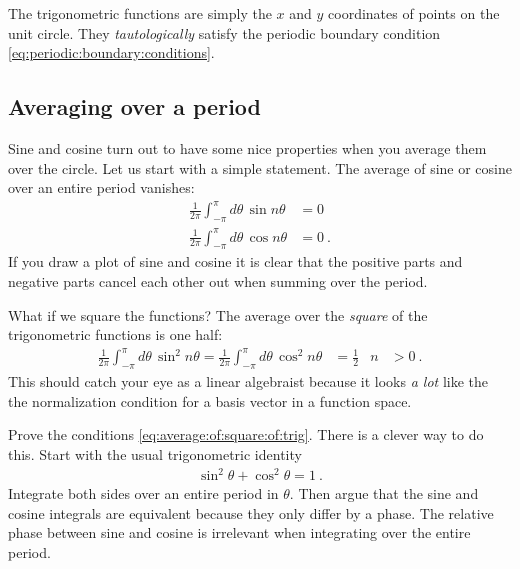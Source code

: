 \documentclass[12pt, oneside]{report}    %
\begin{document}
The trigonometric functions are simply the $x$ and $y$ coordinates of points on the unit circle. They \emph{tautologically} satisfy the periodic boundary condition \eqref{eq:periodic:boundary:conditions}. 


\subsection{Averaging over a period}

Sine and cosine turn out to have some nice properties when you average them over the circle.  
%
Let us start with a simple statement. The average of sine or cosine over an entire period vanishes:
\begin{align}
    \frac{1}{2\pi}
    \int_{-\pi}^\pi d\theta\, \sin n\theta 
    &= 0
    \\
    \frac{1}{2\pi}
    \int_{-\pi}^\pi d\theta\, \cos n\theta 
    &= 0
    \ .
\end{align}
If you draw a plot of sine and cosine it is clear that the positive parts and negative parts cancel each other out when summing over the period.

What if we square the functions? The average over the \emph{square} of the trigonometric functions is one half:
\begin{align}
    \frac{1}{2\pi}
    \int_{-\pi}^\pi d\theta\, \sin^2 n\theta 
    =
    \frac{1}{2\pi}
    \int_{-\pi}^\pi d\theta\, \cos^2 n\theta 
    &= \frac{1}{2} 
    &
    n
    &> 0
    \ .
    \label{eq:average:of:square:of:trig}
\end{align}
This should catch your eye as a linear algebraist because it looks \emph{a lot} like the the normalization condition for a basis vector in a function space. 

\begin{exercise}
Prove the conditions \eqref{eq:average:of:square:of:trig}. There is a clever way to do this. Start with the usual trigonometric identity
\begin{align}
    \sin^2\theta + \cos^2\theta = 1 \ .
\end{align}
Integrate both sides over an entire period in $\theta$. Then argue that the sine and cosine integrals are equivalent because they only differ by a phase. The relative phase between sine and cosine is irrelevant when integrating over the entire period. 
\end{exercise}
\end{document}
